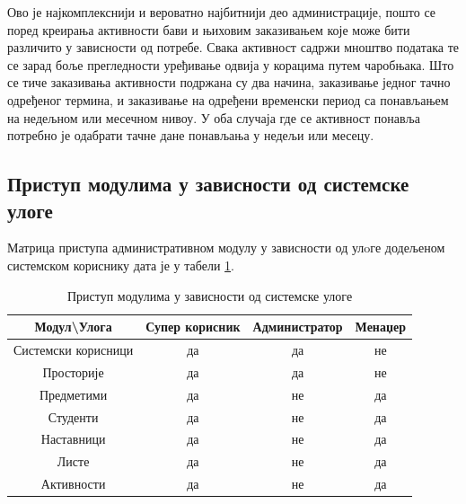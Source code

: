 \documentclass[a4paper, 12pt, diplomski]{etfcyr}
\makeatletter
\gdef\tshortstack{\@ifnextchar[\@tshortstack{\@tshortstack[c]}}
\let\@tshortstack\@shortstack
\makeatother
\begin{document}
\begin{justify}
\begin{labeling}{\smash{\tshortstack[l]{Управљање\\активностима}}}
						\item[\smash{\tshortstack[l]{Управљање\\активностима}}]
							\begin{justify}
								Ово је најкомплекснији и вероватно најбитнији део администрације, пошто се поред креирања активности бави и њиховим заказивањем које може бити различито у зависности од потребе. Свака активност садржи мноштво података те се зарад боље прегледности уређивање одвија у корацима путем чаробњака. Што се тиче заказивања активности подржана су два начина, заказивање једног тачно одређеног термина, и заказивање на одређени временски период са понављањем на недељном или месечном нивоу. У оба случаја где се активност понавља потребно је одабрати тачне дане понављања у недељи или месецу.
							\end{justify}

						\end{labeling}
				\end{justify}

			\newpage

			\subsection{Приступ модулима у зависности од системске улоге}
				\begin{justify}
					Матрица приступа административном модулу у зависности од улoге додељеном системском кориснику дата је у табели \ref{table:1}.
				\end{justify}
				\begin{table}[H]
					\centering
					\begin{tabular}{ c||c|c|c }
						Модул\textbackslash Улога & Супер корисник & Администратор & Менаџер \\
						\hline\hline
						Системски корисници & да & да & не \\
						Просторије & да & да & не \\
						Предметими & да & не & да \\
						Студенти & да & не & да \\
						Наставници & да & не & да \\
						Листе & да & не & да \\
						Активности & да & не & да \\
						\hline
					\end{tabular}
					\caption{Приступ модулима у зависности од системске улоге}
					\label{table:1}
				\end{table}
\end{document}
